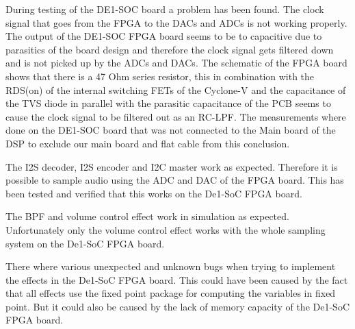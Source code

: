 


During testing of the DE1-SOC board a problem has been found. The clock signal that goes from the FPGA to the DACs and ADCs is not working properly. The output of the DE1-SOC FPGA board seems to be to capacitive due to parasitics of the board design and therefore the clock signal gets filtered down and is not picked up by the ADCs and DACs. The schematic of the FPGA board shows that there is a 47 Ohm series resistor, this in combination with the RDS(on) of the internal switching FETs of the Cyclone-V and the capacitance of the TVS diode in parallel with the parasitic capacitance of the PCB seems to cause the clock signal to be filtered out as an RC-LPF. The measurements where done on the DE1-SOC board that was not connected to the Main board of the DSP to exclude our main board and flat cable from this conclusion.

The I2S decoder, I2S encoder and I2C master work as expected. Therefore it is possible to
sample audio using the ADC and DAC of the FPGA board. This has been tested and verified
that this works on the De1-SoC FPGA board. 

The BPF and volume control effect work in simulation as expected. Unfortunately only the
volume control effect works with the whole sampling system on the De1-SoC FPGA board.

There where various unexpected and unknown bugs when trying to implement the effects in
the De1-SoC FPGA board. This could have been caused by the fact that all effects use the fixed
point package for computing the variables in fixed point. But it could also be caused by the lack
of memory capacity of the De1-SoC FPGA board. 

